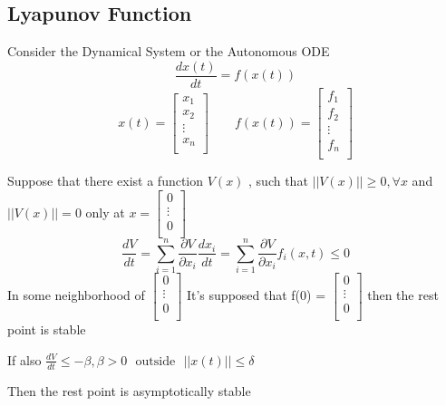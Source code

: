 \documentclass[]{article}
\begin{document}
\subsection{Lyapunov Function}
Consider the Dynamical System or the Autonomous ODE
\[
    \frac{dx(t)}{dt} = f(x(t))
\]
\[
    x(t) = \begin{bmatrix}
        x_{1}  \\
        x_{2}  \\
        \vdots \\
        x_{n}  \\
    \end{bmatrix}
    \qquad
    f(x(t)) = \begin{bmatrix}
        f_{1}  \\
        f_{2}  \\
        \vdots \\
        f_{n}  \\
    \end{bmatrix}
\]
\begin{theorem}
    Suppose that there exist a function $V(x)$ , such that $||V(x)|| \geq 0 , \forall x$ and $||V(x)|| = 0$ only at $x = \begin{bmatrix}
            0      \\
            \vdots \\
            0      \\
        \end{bmatrix}$
    \[
        \frac{dV}{dt} = \sum_{i=1}^{n} \frac{\partial V}{\partial x_i}\frac{d x_i}{dt}
        = \sum_{i=1}^{n} \frac{\partial V}{\partial x_i} f_i(x,t) \leq 0
    \]
    In some neighborhood of $\begin{bmatrix}
            0      \\
            \vdots \\
            0      \\
        \end{bmatrix}$
    It's supposed that f(0) = $\begin{bmatrix}
            0      \\
            \vdots \\
            0      \\
        \end{bmatrix}$ then the rest point is stable

    If also $\displaystyle \frac{dV}{dt} \leq -\beta ,  \beta > 0 \ \ \ \text{outside} \ \ \ ||x(t)|| \leq \delta $

    Then the rest point is asymptotically stable
\end{theorem}
\end{document}
